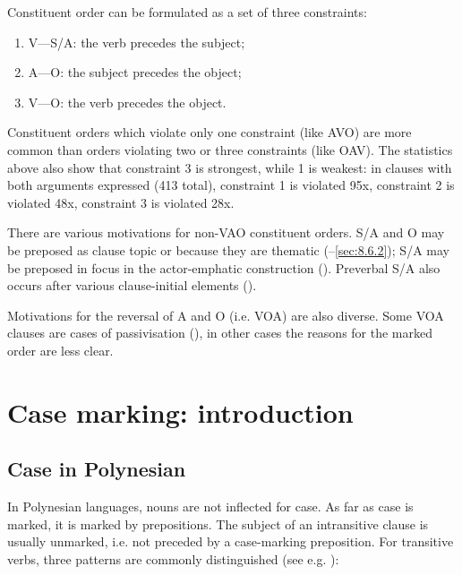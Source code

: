 Constituent order can be formulated as a set of three constraints: 

\begin{enumerate}
\item 
V—S/A: the verb precedes the subject;

\item 
A—O: the subject precedes the object; 

\item 
V—O: the verb precedes the object. 

\end{enumerate}

Constituent orders which violate only one constraint (like AVO) are more common than orders violating two or three constraints (like OAV). The statistics above also show that constraint 3 is strongest, while 1 is weakest: in clauses with both arguments expressed (413 total), constraint 1 is violated 95x, constraint 2 is violated 48x, constraint 3 is violated 28x.

There are various motivations for non-VAO constituent orders. S/A and O may be preposed as clause topic or because they are thematic (–\ref{sec:8.6.2}); S/A may be preposed in focus in the actor-emphatic construction (). Preverbal S/A also occurs after various clause-initial elements ().

Motivations for the reversal of A and O (i.e. VOA) are also diverse. Some VOA clauses are cases of passivisation (), in other cases the reasons for the marked order are less clear. 

\section{Case marking: introduction}\label{sec:8.2}
\subsection{Case in Polynesian}\label{sec:8.2.1}

In Polynesian languages, nouns are not inflected for case. As far as case is marked, it is marked by prepositions. The subject of an intransitive clause is usually unmarked, i.e. not preceded by a case-marking preposition. For transitive verbs, three patterns are commonly distinguished (see e.g. \citealt[67]{Clark1976}):


